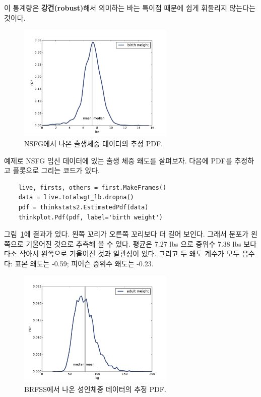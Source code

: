 이 통계량은 {\bf 강건(robust)}해서 의미하는 바는 특이점 때문에 쉽게 휘둘리지 않는다는 것이다.


\begin{figure}
\centerline{\includegraphics[height=2.2in]{figs/density_totalwgt_kde.pdf}}
\caption{NSFG에서 나온 출생체중 데이터의 추정 PDF.}
\label{density_totalwgt_kde}
\end{figure}

예제로 NSFG 임신 데이터에 있는 출생 체중 왜도를 살펴보자.
다음에 PDF를 추정하고 플롯으로 그리는 코드가 있다.

\begin{verbatim}
    live, firsts, others = first.MakeFrames()
    data = live.totalwgt_lb.dropna()
    pdf = thinkstats2.EstimatedPdf(data)
    thinkplot.Pdf(pdf, label='birth weight')
\end{verbatim}

그림~\ref{density_totalwgt_kde}에 결과가 있다.
왼쪽 꼬리가 오른쪽 꼬리보다 더 길어 보인다. 
그래서 분포가 왼쪽으로 기울어진 것으로 추측해 볼 수 있다.
평균은 7.27 lbs 으로 중위수 7.38 lbs 보다 다소 작아서 왼쪽으로 기울어진 것과
일관성이 있다. 그리고 두 왜도 계수가 모두 음수다: 표본 왜도는  -0.59; 피어슨 중위수 왜도는 -0.23.

\begin{figure}
\centerline{\includegraphics[height=2.2in]{figs/density_wtkg2_kde.pdf}}
\caption{BRFSS에서 나온 성인체중 데이터의 추정 PDF.}
\label{density_wtkg2_kde}
\end{figure}

